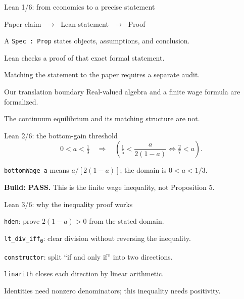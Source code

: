 \begin{frame}{Lean 1/6: from economics to a precise statement}
\begin{center}
\Large Paper claim $\;\longrightarrow\;$ Lean statement $\;\longrightarrow\;$ Proof
\end{center}
\vspace{6mm}
\begin{points}
\item A \texttt{Spec : Prop} states objects, assumptions, and conclusion.
\item Lean checks a proof of that exact formal statement.
\item Matching the statement to the paper requires a separate audit.
\end{points}
\vspace{4mm}
\begin{block}{Our translation boundary}
Real-valued algebra and a finite wage formula are formalized.\par
The continuum equilibrium and its matching structure are not.
\end{block}
\end{frame}

\begin{frame}[fragile]{Lean 2/6: the bottom-gain threshold}
\[0<a<\tfrac13\quad\Longrightarrow\quad
\left(\tfrac15<\frac{a}{2(1-a)}\iff\tfrac27<a\right).\]

\medskip
\texttt{bottomWage a} means $a/[2(1-a)]$; the domain is $0<a<1/3$.\par
\textbf{Build: PASS.} This is the finite wage inequality, not Proposition 5.
\end{frame}

\begin{frame}[fragile]{Lean 3/6: why the inequality proof works}

\vspace{5mm}
\begin{points}
\item \texttt{hden}: prove $2(1-a)>0$ from the stated domain.
\item \texttt{lt\_div\_iff\textsubscript{0}}: clear division without reversing the inequality.
\item \texttt{constructor}: split ``if and only if'' into two directions.\par
\texttt{linarith} closes each direction by linear arithmetic.
\end{points}
\medskip
Identities need nonzero denominators; this inequality needs \alert{positivity}.

\end{frame}

